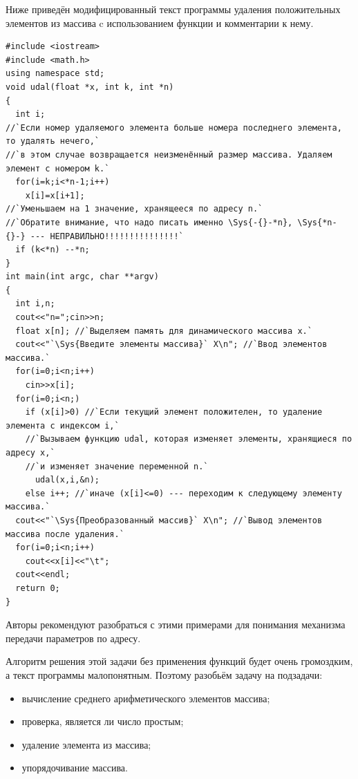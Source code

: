 Ниже приведён модифицированный текст программы удаления положительных элементов из массива  c
использованием функции  и комментарии к нему.
\begin{lstlisting}
#include <iostream>
#include <math.h>
using namespace std;
void udal(float *x, int k, int *n)
{
  int i;
//`Если номер удаляемого элемента больше номера последнего элемента, то удалять нечего,`
//`в этом случае возвращается неизменённый размер массива. Удаляем элемент с номером k.`
  for(i=k;i<*n-1;i++)
    x[i]=x[i+1];
//`Уменьшаем на 1 значение, хранящееся по адресу n.`
//`Обратите внимание, что надо писать именно \Sys{-{}-*n}, \Sys{*n-{}-} --- НЕПРАВИЛЬНО!!!!!!!!!!!!!!!`
  if (k<*n) --*n;
}
int main(int argc, char **argv)
{
  int i,n;
  cout<<"n=";cin>>n;
  float x[n]; //`Выделяем память для динамического массива x.`
  cout<<"`\Sys{Введите элементы массива}` X\n"; //`Ввод элементов массива.`
  for(i=0;i<n;i++)
    cin>>x[i];
  for(i=0;i<n;)
    if (x[i]>0) //`Если текущий элемент положителен, то удаление элемента с индексом i,` 
    //`Вызываем функцию udal, которая изменяет элементы, хранящиеся по адресу x,`
    //`и изменяет значение переменной n.`
      udal(x,i,&n);
    else i++; //`иначе (x[i]<=0) --- переходим к следующему элементу массива.`
  cout<<"`\Sys{Преобразованный массив}` X\n"; //`Вывод элементов массива после удаления.`
  for(i=0;i<n;i++)
    cout<<x[i]<<"\t";
  cout<<endl;
  return 0;
}
\end{lstlisting}

Авторы рекомендуют разобраться с этими примерами для понимания механизма передачи параметров по адресу.


Алгоритм решения этой задачи без применения функций будет очень громоздким, а текст программы малопонятным. 
Поэтому разобьём задачу на подзадачи:

\begin{itemize}
\item вычисление среднего арифметического элементов массива;
\item проверка, является ли число простым;
\item удаление элемента из массива;
\item упорядочивание массива.
\end{itemize}


